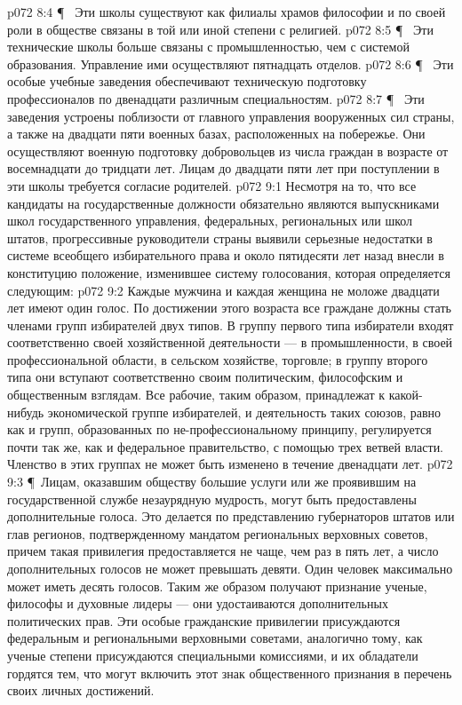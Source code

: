 \vs p072 8:4 \P\ \bibnobreakspace {} Эти школы существуют как филиалы храмов философии и по своей роли в обществе связаны в той или иной степени с религией.
\vs p072 8:5 \P\ \bibnobreakspace {} Эти технические школы больше связаны с промышленностью, чем с системой образования. Управление ими осуществляют пятнадцать отделов.
\vs p072 8:6 \P\ \bibnobreakspace {} Эти особые учебные заведения обеспечивают техническую подготовку профессионалов по двенадцати различным специальностям.
\vs p072 8:7 \P\ \bibnobreakspace {} Эти заведения устроены поблизости от главного управления вооруженных сил страны, а также на двадцати пяти военных базах, расположенных на побережье. Они осуществляют военную подготовку добровольцев из числа граждан в возрасте от восемнадцати до тридцати лет. Лицам до двадцати пяти лет при поступлении в эти школы требуется согласие родителей.
\vs p072 9:1 Несмотря на то, что все кандидаты на государственные должности обязательно являются выпускниками школ государственного управления, федеральных, региональных или школ штатов, прогрессивные руководители страны выявили серьезные недостатки в системе всеобщего избирательного права и около пятидесяти лет назад внесли в конституцию положение, изменившее систему голосования, которая определяется следующим:
\vs p072 9:2 \bibnobreakspace Каждые мужчина и каждая женщина не моложе двадцати лет имеют один голос. По достижении этого возраста все граждане должны стать членами групп избирателей двух типов. В группу первого типа избиратели входят соответственно своей хозяйственной деятельности --- в промышленности, в своей профессиональной области, в сельском хозяйстве, торговле; в группу второго типа они вступают соответственно своим политическим, философским и общественным взглядам. Все рабочие, таким образом, принадлежат к какой\hyp{}нибудь экономической группе избирателей, и деятельность таких союзов, равно как и групп, образованных по не\hyp{}профессиональному принципу, регулируется почти так же, как и федеральное правительство, с помощью трех ветвей власти. Членство в этих группах не может быть изменено в течение двенадцати лет.
\vs p072 9:3 \P\ \bibnobreakspace Лицам, оказавшим обществу большие услуги или же проявившим на государственной службе незаурядную мудрость, могут быть предоставлены дополнительные голоса. Это делается по представлению губернаторов штатов или глав регионов, подтвержденному мандатом региональных верховных советов, причем такая привилегия предоставляется не чаще, чем раз в пять лет, а число дополнительных голосов не может превышать девяти. Один человек максимально может иметь десять голосов. Таким же образом получают признание ученые, философы и духовные лидеры --- они удостаиваются дополнительных политических прав. Эти особые гражданские привилегии присуждаются федеральным и региональными верховными советами, аналогично тому, как ученые степени присуждаются специальными комиссиями, и их обладатели гордятся тем, что могут включить этот знак общественного признания в перечень своих личных достижений.
